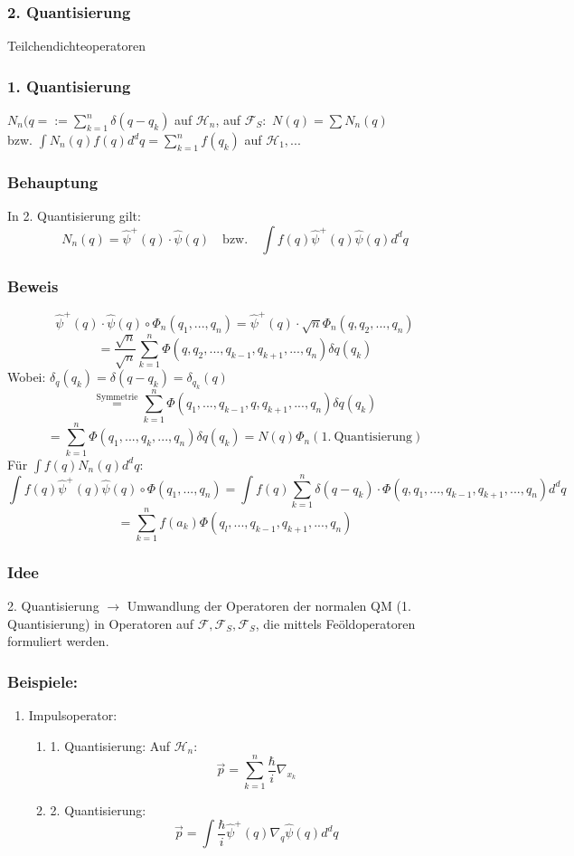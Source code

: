 \documentclass[twoside,a4paper]{scrartcl}
\renewcommand{\1}{\mathds{1}}
\newcommand{\ra}{\rightarrow}
\renewcommand{\H}{\mathcal{H}}
\newcommand{\F}{\mathcal{F}}
\begin{document}
\subsubsection*{2. Quantisierung}
Teilchendichteoperatoren
\subsubsection*{1. Quantisierung}
$N_n(q=:=\sum_{k=1}^n\delta(q-q_k)$ auf $\H_n$, auf $\F_S:$ $N(q)=\sum N_n(q)$\\
bzw. $\int N_n(q) f(q)d^dq=\sum_{k=1}^n f(q_k)$ auf $\H_1,...$
\subsubsection*{Behauptung}
In 2. Quantisierung gilt:
$$N_n(q)=\hat \psi^+(q)\cdot \hat \psi(q) \quad \mathrm{bzw.} \quad \int f(q)\hat \psi^+(q)\hat\psi(q)d^dq$$
\subsubsection*{Beweis}
$$\hat \psi^+(q)\cdot \hat \psi(q)\circ \Phi_n(q_1,...,q_n)=\hat \psi^+(q)\cdot \sqrt{n} \Phi_n(q,q_2,...,q_n)$$
$$=\frac{\sqrt{n}}{\sqrt{n}} \sum_{k=1}^n \Phi(q,q_2,...,q_{k-1},q_{k+1},...,q_n) \delta q(q_k)$$
Wobei: $\delta_q(q_k)=\delta(q-q_k)=\delta_{q_k}(q)$
$$\stackrel{\mathrm{Symmetrie}}{=}\sum_{k=1}^n \Phi(q_1,...,q_{k-1},q,q_{k+1},...,q_n) \delta q(q_k)$$
$$=\sum_{k=1}^n \Phi(q_1,...,q_k,...,q_n) \delta q(q_k)=N(q)\Phi_n(1. \ \mathrm{Quantisierung})$$
Für $\int f(q)N_n(q)d^dq$:
$$\int f(q)\hat \psi^+(q)\hat \psi(q) \circ \Phi(q_1,...,q_n)=\int f(q) \sum_{k=1}^n \delta(q-q_k) \cdot \Phi(q,q_1,...,q_{k-1},q_{k+1},...,q_n)d^dq$$
$$=\sum_{k=1}^n f(a_k) \Phi(q_l,...,q_{k-1},q_{k+1},...,q_n)$$
\subsubsection*{Idee}
2. Quantisierung $\ra$ Umwandlung der Operatoren der normalen QM (1. Quantisierung) in Operatoren auf $\F,\F_S,\F_S$, die mittels Feöldoperatoren formuliert werden.
\subsubsection*{Beispiele:}
\begin{enumerate}
\item Impulsoperator:
\begin{enumerate}
\item 1. Quantisierung: Auf $\H_n$: $$\vec p=\sum_{k=1}^n \frac{\hbar}{i} \nabla_{x_k}$$
\item 2. Quantisierung: $$\vec p=\int \frac{\hbar}{i} \hat \psi^+(q) \nabla_q \hat \psi(q) d^dq$$
\end{enumerate}
\end{enumerate}
\end{document}
